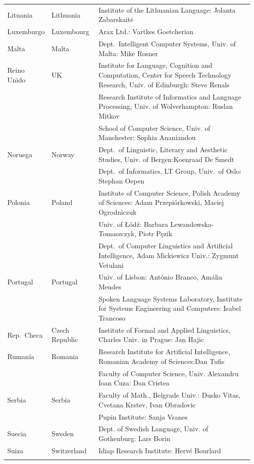 \begin{longtable}{@{}llp{113mm}@{}}
  Lituania & \textcolor{grey1}{Lithuania} & Institute of the Lithuanian Language: Jolanta Zabarskaitė \\ \addlinespace
  Luxemburgo & \textcolor{grey1}{Luxembourg} & Arax Ltd.: Vartkes Goetcherian \\ \addlinespace
  Malta & \textcolor{grey1}{Malta} & Dept.~Intelligent Computer Systems, Univ. of Malta: Mike Rosner \\ \addlinespace Reino Unido & \textcolor{grey1}{UK} & Institute for Language, Cognition and Computation, Center for Speech Technology Research, Univ. of Edinburgh: Steve Renals \\ \addlinespace 
  & & Research Institute of Informatics and Language Processing, Univ. of Wolverhampton: Ruslan Mitkov \\ \addlinespace 
  & & School of Computer Science, Univ. of Manchester: Sophia Ananiandou \\ \addlinespace 
  Noruega & \textcolor{grey1}{Norway} & Dept.~of Linguistic, Literary and Aesthetic Studies, Univ. of Bergen:\newline Koenraad De Smedt \\ \addlinespace 
  & & Dept.~of Informatics, LT Group, Univ.~of Oslo: Stephan Oepen \\ \addlinespace
  Polonia & \textcolor{grey1}{Poland} & Institute of Computer Science, Polish Academy of Sciences: Adam Przepiórkowski, Maciej Ogrodniczuk \\ \addlinespace
  & & Univ. of Łódź: Barbara Lewandowska-Tomaszczyk, Piotr Pęzik \\ \addlinespace
  & & Dept.~of Computer Linguistics and Artificial Intelligence, Adam Mickiewicz Univ.: Zygmunt Vetulani \\ \addlinespace
  Portugal & \textcolor{grey1}{Portugal} & Univ. of Lisbon: António Branco, Amália Mendes \\ \addlinespace
  & & Spoken Language Systems Laboratory, Institute for Systems Engineering and Computers: Isabel Trancoso \\ \addlinespace
  Rep.~Checa & \textcolor{grey1}{Czech Republic} & Institute of Formal and Applied Linguistics, Charles Univ. in Prague: Jan Hajic \\ \addlinespace
  Rumanía & \textcolor{grey1}{Romania} & Research Institute for Artificial Intelligence, Romanian Academy of Sciences:\newline Dan Tufis \\ \addlinespace
  & & Faculty of Computer Science, Univ. Alexandru Ioan Cuza: Dan Cristea \\ \addlinespace
  Serbia & \textcolor{grey1}{Serbia} & Faculty of Math., Belgrade Univ.: Dusko Vitas, Cvetana Krstev, Ivan Obradovic \\ \addlinespace
  & & Pupin Institute: Sanja Vranes \\ \addlinespace  
  Suecia & \textcolor{grey1}{Sweden} & Dept. of Swedish Language, Univ. of Gothenburg: Lars Borin \\ \addlinespace 
  Suiza & \textcolor{grey1}{Switzerland} & Idiap Research Institute: Hervé Bourlard \\ \addlinespace 
\end{longtable}
\normalsize

